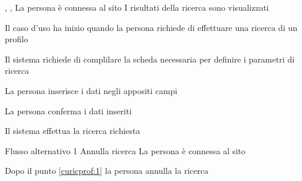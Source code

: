 \tabcuvspace

%

{, , }
{La persona è connessa al sito}
{I risultati della ricerca sono visualizzati}
{\begin{enumCU}
	\item Il caso d'uso ha inizio quando la persona richiede di effettuare una ricerca di un profilo
	\item Il sistema richiede di complilare la scheda necessaria per definire i parametri di ricerca
	\item La persona inserisce i dati negli appositi campi \label{curicprof:1}
	\item La persona conferma i dati inseriti
	\item Il sistema effettua la ricerca richiesta
\end{enumCU}}
%
{Flusso alternativo 1}%
{Annulla ricerca}%
{La persona è connessa al sito}%
{\postNulle}%
{\begin{enumCU}
		\item Dopo il punto \ref{curicprof:1} la persona annulla la ricerca
	\end{enumCU}}%

\tabcuvspace

%

